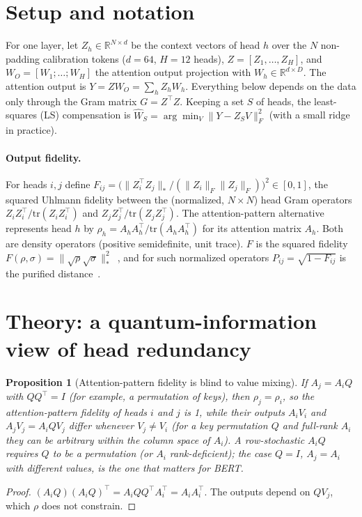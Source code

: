 \documentclass[11pt]{article}
\newtheorem{proposition}{Proposition}
\begin{document}
\section{Setup and notation}
For one layer, let $Z_h\in\mathbb{R}^{N\times d}$ be the context vectors of head $h$ over the $N$ non-padding calibration
tokens ($d=64$, $H=12$ heads), $Z=[Z_1,\dots,Z_H]$, and $W_O=[W_1;\dots;W_H]$ the attention output projection with
$W_h\in\mathbb{R}^{d\times D}$. The attention output is $Y=ZW_O=\sum_h Z_hW_h$. Everything below depends on the data only
through the Gram matrix $G=Z^\top Z$. Keeping a set $S$ of heads, the least-squares (LS) compensation is
$\widehat W_S=\arg\min_{V}\|Y-Z_SV\|_F^2$ (with a small ridge in practice).

\paragraph{Output fidelity.} For heads $i,j$ define
$F_{ij}=\big(\|Z_i^\top Z_j\|_*/(\|Z_i\|_F\|Z_j\|_F)\big)^2\in[0,1]$, the squared Uhlmann fidelity between the (normalized, $N\times N$) head Gram operators $Z_iZ_i^\top/\mathrm{tr}(Z_iZ_i^\top)$ and $Z_jZ_j^\top/\mathrm{tr}(Z_jZ_j^\top)$. The attention-pattern alternative represents head $h$ by $\rho_h=A_hA_h^\top/\mathrm{tr}(A_hA_h^\top)$ for
its attention matrix $A_h$. Both are density operators (positive semidefinite, unit trace). $F$ is the squared fidelity
$F(\rho,\sigma)=\|\sqrt\rho\sqrt\sigma\|_*^2$~\citep{uhlmann1976transition,jozsa1994fidelity}, and for such normalized operators
$P_{ij}=\sqrt{1-F_{ij}}$ is the purified distance~\citep{tomamichel2010duality}.

\section{Theory: a quantum-information view of head redundancy}
\begin{proposition}[Attention-pattern fidelity is blind to value mixing]\label{prop:blind}
If $A_j=A_iQ$ with $QQ^\top=I$ (for example, a permutation of keys), then $\rho_j=\rho_i$, so the attention-pattern
fidelity of heads $i$ and $j$ is 1, while their outputs $A_iV_i$ and $A_jV_j=A_iQV_j$ differ whenever $V_j\ne V_i$
(for a key permutation $Q$ and full-rank $A_i$ they can be arbitrary within the column space of $A_i$). A row-stochastic
$A_iQ$ requires $Q$ to be a permutation (or $A_i$ rank-deficient); the case $Q=I$, $A_j=A_i$ with different values, is the
one that matters for BERT.
\end{proposition}
\begin{proof}
$(A_iQ)(A_iQ)^\top=A_iQQ^\top A_i^\top=A_iA_i^\top$. The outputs depend on $QV_j$, which $\rho$ does not constrain.
\end{proof}
\end{document}
